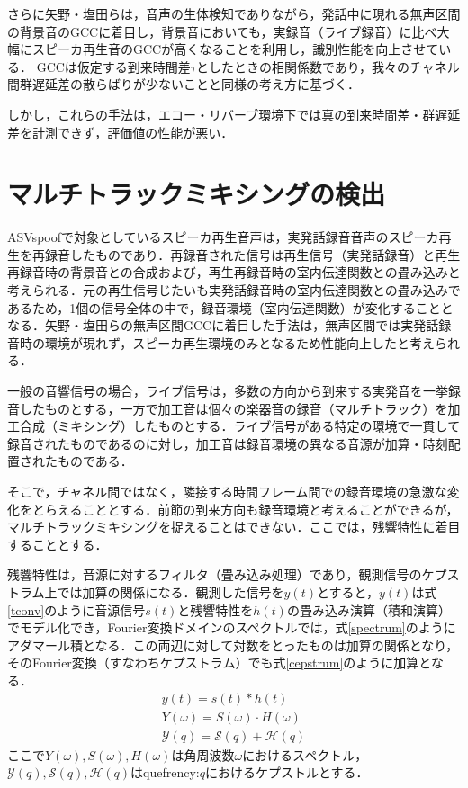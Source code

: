 \documentclass[technicalreport]{ieicej}
\begin{document}
さらに矢野・塩田らは，音声の生体検知でありながら，発話中に現れる無声区間の背景音のGCCに着目し，背景音においても，実録音（ライブ録音）に比べ大幅にスピーカ再生音のGCCが高くなることを利用し，識別性能を向上させている\cite{groundICGCC}．
GCCは仮定する到来時間差$\tau$としたときの相関係数であり，我々のチャネル間群遅延差の散らばりが少ないことと同様の考え方に基づく．

しかし，これらの手法は，エコー・リバーブ環境下では真の到来時間差・群遅延差を計測できず，評価値の性能が悪い．

\section{マルチトラックミキシングの検出}

ASVspoofで対象としているスピーカ再生音声は，実発話録音音声のスピーカ再生を再録音したものであり．再録音された信号は再生信号（実発話録音）と再生再録音時の背景音との合成および，再生再録音時の室内伝達関数との畳み込みと考えられる．元の再生信号じたいも実発話録音時の室内伝達関数との畳み込みであるため，1個の信号全体の中で，録音環境（室内伝達関数）が変化することとなる．矢野・塩田らの無声区間GCCに着目した手法は，無声区間では実発話録音時の環境が現れず，スピーカ再生環境のみとなるため性能向上したと考えられる．

一般の音響信号の場合，ライブ信号は，多数の方向から到来する実発音を一挙録音したものとする，一方で加工音は個々の楽器音の録音（マルチトラック）を加工合成（ミキシング）したものとする．ライブ信号がある特定の環境で一貫して録音されたものであるのに対し，加工音は録音環境の異なる音源が加算・時刻配置されたものである．

そこで，チャネル間ではなく，隣接する時間フレーム間での録音環境の急激な変化をとらえることとする．前節の到来方向も録音環境と考えることができるが，マルチトラックミキシングを捉えることはできない．ここでは，残響特性に着目することとする．

残響特性は，音源に対するフィルタ（畳み込み処理）であり，観測信号のケプストラム上では加算の関係になる．観測した信号を$y(t)$とすると，$y(t)$は式\eqref{tconv}のように音源信号$s(t)$と残響特性を$h(t)$の畳み込み演算（積和演算）でモデル化でき，Fourier変換ドメインのスペクトルでは，式\eqref{spectrum}のようにアダマール積となる．この両辺に対して対数をとったものは加算の関係となり，そのFourier変換（すなわちケプストラム）でも式\eqref{cepstrum}のように加算となる．
\begin{gather}
y(t) = s(t) * h(t) \label{tconv}\\
Y(\omega) = S(\omega) \cdot H(\omega) \label{spectrum}\\
\mathcal{Y}(q) = \mathcal{S}(q) + \mathcal{H}(q) \label{cepstrum}
\end{gather}
ここで$Y(\omega), S(\omega), H(\omega)$は角周波数$\omega$におけるスペクトル，$\mathcal{Y}(q), \mathcal{S}(q), \mathcal{H}(q)$はquefrency:$q$におけるケプストルとする．
\end{document}
